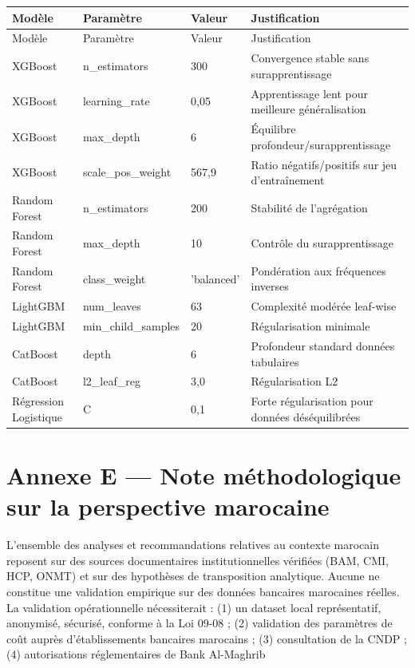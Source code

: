 \begin{longtable}{|p{}|p{}|p{}|p{}|}
\hline
Modèle & Paramètre & Valeur & Justification \\
\hline
\endfirsthead
\hline
Modèle & Paramètre & Valeur & Justification \\
\hline
\endhead
XGBoost & n\_estimators & 300 & Convergence stable sans surapprentissage \\
\hline
XGBoost & learning\_rate & 0,05 & Apprentissage lent pour meilleure généralisation \\
\hline
XGBoost & max\_depth & 6 & Équilibre profondeur/surapprentissage \\
\hline
XGBoost & scale\_pos\_weight & 567,9 & Ratio négatifs/positifs sur jeu d'entraînement \\
\hline
Random Forest & n\_estimators & 200 & Stabilité de l'agrégation \\
\hline
Random Forest & max\_depth & 10 & Contrôle du surapprentissage \\
\hline
Random Forest & class\_weight & 'balanced' & Pondération aux fréquences inverses \\
\hline
LightGBM & num\_leaves & 63 & Complexité modérée leaf-wise \\
\hline
LightGBM & min\_child\_samples & 20 & Régularisation minimale \\
\hline
CatBoost & depth & 6 & Profondeur standard données tabulaires \\
\hline
CatBoost & l2\_leaf\_reg & 3,0 & Régularisation L2 \\
\hline
Régression Logistique & C & 0,1 & Forte régularisation pour données déséquilibrées \\
\hline
\end{longtable}

\section{Annexe E — Note méthodologique sur la perspective marocaine}

L'ensemble des analyses et recommandations relatives au contexte marocain reposent sur des sources documentaires institutionnelles vérifiées (BAM, CMI, HCP, ONMT) et sur des hypothèses de transposition analytique. Aucune ne constitue une validation empirique sur des données bancaires marocaines réelles. La validation opérationnelle nécessiterait : (1) un dataset local représentatif, anonymisé, sécurisé, conforme à la Loi 09-08 ; (2) validation des paramètres de coût auprès d'établissements bancaires marocains ; (3) consultation de la CNDP ; (4) autorisations réglementaires de Bank Al-Maghrib
